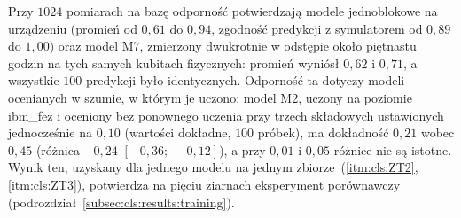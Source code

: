 Przy $1024$ pomiarach na bazę odporność potwierdzają modele jednoblokowe na urządzeniu (promień od $0{,}61$ do $0{,}94$, zgodność predykcji z symulatorem od $0{,}89$ do $1{,}00$) oraz model M7, zmierzony dwukrotnie w odstępie około piętnastu godzin na tych samych kubitach fizycznych: promień wyniósł $0{,}62$ i $0{,}71$, a wszystkie $100$ predykcji było identycznych.
Odporność ta dotyczy modeli ocenianych w szumie, w którym je uczono: model M2, uczony na poziomie ibm\_fez i oceniony bez ponownego uczenia przy trzech składowych ustawionych jednocześnie na $0{,}10$ (wartości dokładne, $100$ próbek), ma dokładność $0{,}21$ wobec $0{,}45$ (różnica $-0{,}24$ $[-0{,}36;\,-0{,}12]$), a przy $0{,}01$ i $0{,}05$ różnice nie są istotne.
Wynik ten, uzyskany dla jednego modelu na jednym zbiorze~(\ref{itm:cls:ZT2}, \ref{itm:cls:ZT3}), potwierdza na pięciu ziarnach eksperyment porównawczy (podrozdział~\ref{subsec:cls:results:training}).

